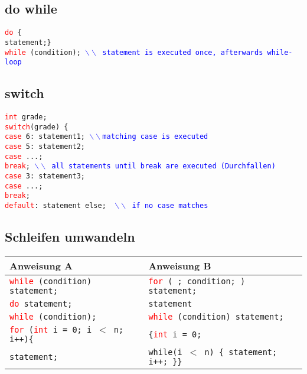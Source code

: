 \documentclass[a3paper, 10pt, landscape]{scrartcl}
\newcommand{\code}[1]{\texttt{#1}}
\begin{document}
\begin{multicols*}{3}
	\subsection{do while}
	\code{\textcolor{red}{do} \{ \\
	\phantom{d} statement;\} \\
	\textcolor{red}{while} (condition); \textcolor{blue}{$\backslash \backslash$ statement is executed once, afterwards while-loop}
	}
	\subsection{switch}
	\code{\textcolor{red}{int} grade;\\
	\textcolor{red}{switch}(grade) \{ \\
	\phantom{a} \textcolor{red}{case} 6: statement1; \textcolor{blue}{$\backslash \backslash$matching case is executed} \\
	\phantom{a} \textcolor{red}{case} 5: statement2; \\
	\phantom{a} \textcolor{red}{case} ...; \\
	\phantom{ab} \textcolor{red}{break}; \textcolor{blue}{$\backslash \backslash$ all statements until break are executed (Durchfallen)} \\
	\phantom{a} \textcolor{red}{case} 3: statement3; \\
	\phantom{a} \textcolor{red}{case} ...; \\
	\phantom{ab} \textcolor{red}{break}; \\
	\textcolor{red}{default}: statement else; \textcolor{blue}{ $\backslash \backslash$ if no case matches}
	}
	
	\subsection{Schleifen umwandeln}
	
	\begin{tabular}{l | l}
	\textbf{Anweisung A} & \textbf{Anweisung B} \\
	\hline
	\code{\textcolor{red}{while} (condition) statement;} & \code{\textcolor{red}{for} ( ; condition; ) statement;} \\
	\hline
	\code{\textcolor{red}{do} statement;}  & \code{statement} \\
	\code{\textcolor{red}{while} (condition);} & \code{\textcolor{red}{while} (condition) statement;} \\
	\hline
	\code{\textcolor{red}{for} (\textcolor{red}{int} i = 0; i $<$ n; i++)\{} & \code{\{\textcolor{red}{int} i = 0;}\\
	\code{\phantom{for }statement;} & \code{while(i $<$ n) \{ statement; i++; \}\}}
	\end{tabular}
	

\end{multicols*}
\end{document}
